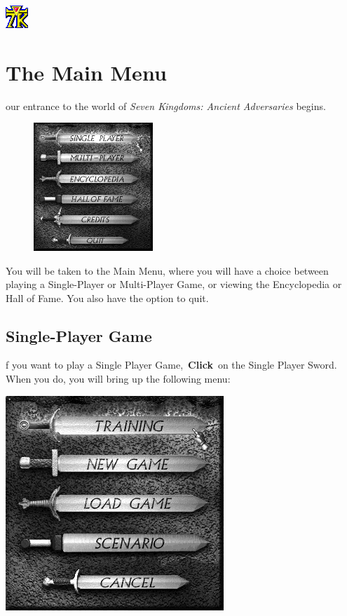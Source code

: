 \includegraphics[width=0.07\linewidth]{7kicon} %

\clearpage %

\section{The Main Menu}


our entrance to the world of \textit{Seven Kingdoms: Ancient Adversaries} begins.

\begin{figure}
	\begin{center}
		\vspace{-20pt}
		\includegraphics[width=0.4\textwidth]{SWmainmenu}
	\end{center}
	\vspace{-20pt}
\end{figure}

You will be taken to the Main Menu, where you will have a choice between playing a Single-Player or Multi-Player Game, or viewing the Encyclopedia or Hall of Fame. You also have the option to quit.

\subsection{Single-Player Game}


f you want to play a Single Player Game, \textbf{Click} on the Single Player Sword. When you do, you will bring up the following menu: 

\begin{center}
	\includegraphics[width=0.5\linewidth]{SWsingleplayer}
\end{center}


